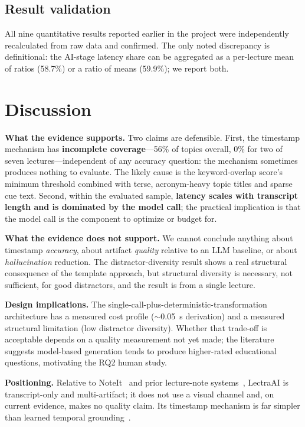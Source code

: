 \documentclass[conference]{IEEEtran}
\begin{document}
\subsection{Result validation}
All nine quantitative results reported earlier in the project were independently recalculated from raw data and confirmed. The only noted discrepancy is definitional: the AI-stage latency share can be aggregated as a per-lecture mean of ratios (58.7\%) or a ratio of means (59.9\%); we report both.

\section{Discussion}
\textbf{What the evidence supports.} Two claims are defensible. First, the timestamp mechanism has \textbf{incomplete coverage}---56\% of topics overall, 0\% for two of seven lectures---independent of any accuracy question: the mechanism sometimes produces nothing to evaluate. The likely cause is the keyword-overlap score's minimum threshold combined with terse, acronym-heavy topic titles and sparse cue text. Second, within the evaluated sample, \textbf{latency scales with transcript length and is dominated by the model call}; the practical implication is that the model call is the component to optimize or budget for.

\textbf{What the evidence does not support.} We cannot conclude anything about timestamp \emph{accuracy}, about artifact \emph{quality} relative to an LLM baseline, or about \emph{hallucination} reduction. The distractor-diversity result shows a real structural consequence of the template approach, but structural diversity is necessary, not sufficient, for good distractors, and the result is from a single lecture.

\textbf{Design implications.} The single-call-plus-deterministic-transformation architecture has a measured cost profile ($\sim$0.05~s derivation) and a measured structural limitation (low distractor diversity). Whether that trade-off is acceptable depends on a quality measurement not yet made; the literature~\cite{lin2025,scaria2024,alhazmi2024,qiu2020} suggests model-based generation tends to produce higher-rated educational questions, motivating the RQ2 human study.

\textbf{Positioning.} Relative to NoteIt~\cite{zhao2025} and prior lecture-note systems~\cite{lee2023,xu2019}, LectraAI is transcript-only and multi-artifact; it does not use a visual channel and, on current evidence, makes no quality claim. Its timestamp mechanism is far simpler than learned temporal grounding~\cite{zhang2023,liu2023}.
\end{document}
